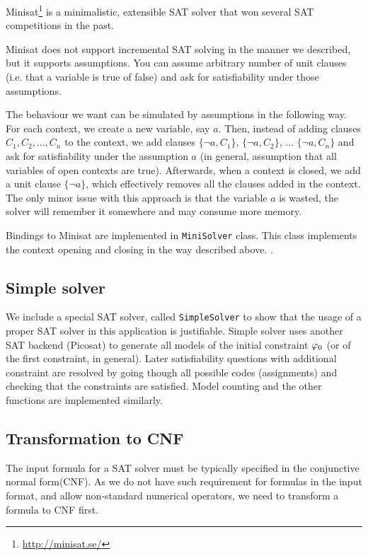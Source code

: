 Minisat\footnote{\url{http://minisat.se/}} \cite{minisat} is a minimalistic,
  extensible SAT solver that won several SAT competitions in the past.

Minisat does not support incremental SAT solving in the manner we described,
  but it supports assumptions.
You can assume arbitrary number of unit clauses
  (i.e. that a variable is true of false) and ask for satisfiability under
  those assumptions.

The behaviour we want can be simulated by assumptions in the following way.
For each context, we create a new variable, say $a$.
Then, instead of adding clauses $C_1, C_2, ..., C_n$ to the context,
  we add clauses $\{\neg a, C_1\}$, $\{\neg a, C_2\}$, ... $\{\neg a, C_n\}$ and ask
  for satisfiability under the assumption $a$ (in general,
  assumption that all variables of open contexts are true).
Afterwards, when a context is closed, we add a unit clause $\{\neg a\}$,
  which effectively removes all the clauses added in the context.
The only minor issue with this approach is that the variable $a$ is wasted,
  the solver will remember it somewhere and may consume more memory.

Bindings to Minisat are implemented in \texttt{MiniSolver} class.
This class implements the context opening and closing in the way described above.
.

\subsection{Simple solver}

We include a special SAT solver, called \texttt{SimpleSolver} to show that
  the usage of a proper SAT solver in this application is justifiable.
Simple solver uses another SAT backend (Picosat) to generate all
  models of the initial constraint $\varphi_0$ (or of the first constraint, in general).
Later satisfiability questions with additional constraint are
  resolved by going though all possible codes (assignments) and
  checking that the constraints are satisfied.
Model counting and the other functions are implemented similarly.

\subsection{Transformation to CNF}

The input formula for a SAT solver must be typically specified
  in the conjunctive normal form(CNF).
As we do not have such requirement for formulas in the input format,
  and allow non-standard numerical operators,
  we need to transform a formula to CNF first.

